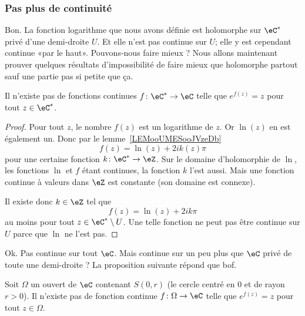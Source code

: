 \subsubsection{Pas plus de continuité}

Bon. La fonction logarithme que nous avons définie est holomorphe sur \( \eC^*\) privé d'une demi-droite \( U\). Et elle n'est pas continue sur \( U\); elle y est cependant continue «par le haut». Pouvons-nous faire mieux ? Nous allons maintenant prouver quelques résultats d'impossibilité de faire mieux que holomorphe partout sauf une partie pas si petite que ça.

\begin{proposition}
	Il n'existe pas de fonctions continues \( f\colon \eC^*\to \eC\) telle que \(  e^{f(z)}=z\) pour tout \( z\in \eC^*\).
\end{proposition}

\begin{proof}
	Pour tout \( z\), le nombre \( f(z)\) est un logarithme de \( z\). Or \( \ln(z)\) en est également un. Donc par le lemme~\ref{LEMooUMESooJVzeDb}
	\begin{equation}
		f(z)=\ln(z)+2i k(z)\pi
	\end{equation}
	pour une certaine fonction \( k\colon \eC^*\to \eZ\). Sur le domaine d'holomorphie de \( \ln\), les fonctions \( \ln\) et \( f\) étant continues, la fonction \( k\) l'est aussi. Mais une fonction continue à valeurs dans \( \eZ\) est constante (son domaine est connexe).

	Il existe donc \( k\in \eZ\) tel que
	\begin{equation}
		f(z)=\ln(z)+2ik\pi
	\end{equation}
	au moins pour tout \( z\in \eC^*\setminus U\). Une telle fonction ne peut pas être continue sur \( U\) parce que \( \ln\) ne l'est pas.
\end{proof}

Ok. Pas continue sur tout \( \eC\). Mais continue sur un peu plus que \( \eC\) privé de toute une demi-droite ? La proposition suivante répond que bof.

\begin{proposition}
	Soit \( \Omega\) un ouvert de \( \eC\) contenant \( S(0,r)\) (le cercle centré en \( 0\) et de rayon \( r>0\)). Il n'existe pas de fonction continue \( f\colon \Omega\to \eC\) telle que \(  e^{f(z)}=z\) pour tout \( z\in \Omega\).
\end{proposition}


